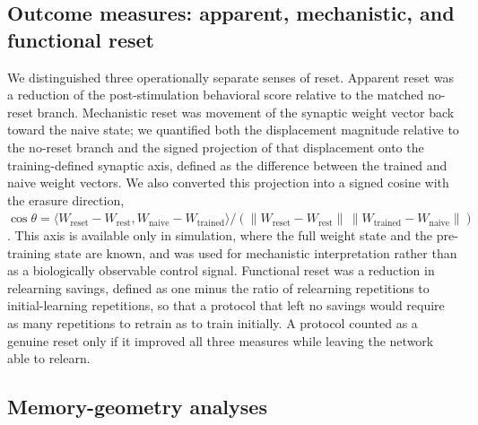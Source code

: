 \documentclass{article}
\begin{document}
\subsection*{Outcome measures: apparent, mechanistic, and functional reset}

We distinguished three operationally separate senses of reset. Apparent reset was a reduction of the post-stimulation behavioral score relative to the matched no-reset branch. Mechanistic reset was movement of the synaptic weight vector back toward the naive state; we quantified both the displacement magnitude relative to the no-reset branch and the signed projection of that displacement onto the training-defined synaptic axis, defined as the difference between the trained and naive weight vectors. We also converted this projection into a signed cosine with the erasure direction, $\cos\theta = \langle W_{\mathrm{reset}} - W_{\mathrm{rest}}, W_{\mathrm{naive}} - W_{\mathrm{trained}}\rangle / (\|W_{\mathrm{reset}} - W_{\mathrm{rest}}\|\,\|W_{\mathrm{trained}} - W_{\mathrm{naive}}\|)$. This axis is available only in simulation, where the full weight state and the pre-training state are known, and was used for mechanistic interpretation rather than as a biologically observable control signal. Functional reset was a reduction in relearning savings, defined as one minus the ratio of relearning repetitions to initial-learning repetitions, so that a protocol that left no savings would require as many repetitions to retrain as to train initially. A protocol counted as a genuine reset only if it improved all three measures while leaving the network able to relearn.

\subsection*{Memory-geometry analyses}
\end{document}
